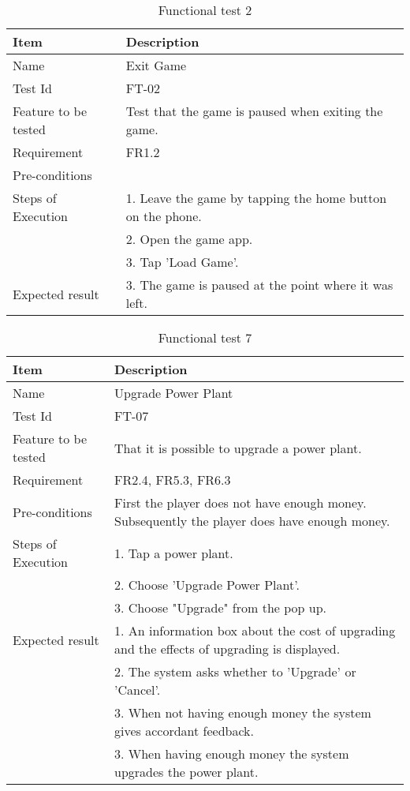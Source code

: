 \begin{table}[H]
\centering
	\begin{tabular}{ l | p{8cm} }
		\hline
		{\bf Item} & {\bf Description} \\ \hline
		Name & Exit Game \\ 
		Test Id & FT-02 \\ 
		Feature to be tested & Test that the game is paused when exiting the game. \\ 
		Requirement & FR1.2 \\ 
		Pre-conditions & \\ 
		Steps of Execution & 1. Leave the game by tapping the home button on the phone. \\
		& 2. Open the game app. \\
		& 3. Tap 'Load Game'. \\
		Expected result & 3. The game is paused at the point where it was left. \\  
	\end{tabular}
	\caption{Functional test 2}
\end{table}

\begin{table}[H]
\centering
	\begin{tabular}{ l | p{8cm} }
		\hline
		{\bf Item} & {\bf Description} \\ \hline
		Name & Upgrade Power Plant\\ 
		Test Id & FT-07 \\ 
		Feature to be tested & That it is possible to upgrade a power plant. \\ 
		Requirement & FR2.4, FR5.3, FR6.3 \\ 
		Pre-conditions & First the player does not have enough money. Subsequently the player does have enough money. \\ 
		Steps of Execution & 1. Tap a power plant. \\ 
		& 2. Choose 'Upgrade Power Plant'. \\
		& 3. Choose "Upgrade" from the pop up. \\
		Expected result & 1. An information box about the cost of upgrading and the effects of upgrading is displayed. \\
		& 2. The system asks whether to 'Upgrade' or 'Cancel'. \\
		& 3. When not having enough money the system gives accordant feedback. \\
		& 3. When having enough money the system upgrades the power plant. \\
	\end{tabular}
	\caption{Functional test 7}
\end{table}

